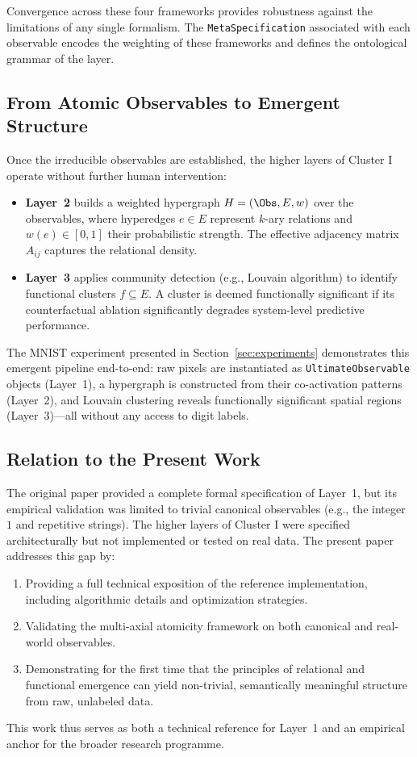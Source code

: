 Convergence across these four frameworks provides robustness against the limitations of any single formalism. The \texttt{MetaSpecification} associated with each observable encodes the weighting of these frameworks and defines the ontological grammar of the layer.

\subsection{From Atomic Observables to Emergent Structure}

Once the irreducible observables are established, the higher layers of Cluster I operate without further human intervention:

\begin{itemize}
    \item \textbf{Layer~2} builds a weighted hypergraph $H = (\Obs, E, w)$ over the observables, where hyperedges $e \in E$ represent $k$-ary relations and $w(e) \in [0,1]$ their probabilistic strength. The effective adjacency matrix $A_{ij}$ captures the relational density.
    \item \textbf{Layer~3} applies community detection (e.g., Louvain algorithm) to identify functional clusters $f \subseteq E$. A cluster is deemed functionally significant if its counterfactual ablation significantly degrades system-level predictive performance.
\end{itemize}

The MNIST experiment presented in Section~\ref{sec:experiments} demonstrates this emergent pipeline end-to-end: raw pixels are instantiated as \texttt{UltimateObservable} objects (Layer~1), a hypergraph is constructed from their co-activation patterns (Layer~2), and Louvain clustering reveals functionally significant spatial regions (Layer~3)---all without any access to digit labels.

\subsection{Relation to the Present Work}

The original \Apeiron{} paper \cite{beniers2026apeiron} provided a complete formal specification of Layer~1, but its empirical validation was limited to trivial canonical observables (e.g., the integer $1$ and repetitive strings). The higher layers of Cluster I were specified architecturally but not implemented or tested on real data. The present paper addresses this gap by:

\begin{enumerate}
    \item Providing a full technical exposition of the reference implementation, including algorithmic details and optimization strategies.
    \item Validating the multi-axial atomicity framework on both canonical and real-world observables.
    \item Demonstrating for the first time that the principles of relational and functional emergence can yield non-trivial, semantically meaningful structure from raw, unlabeled data.
\end{enumerate}

This work thus serves as both a technical reference for Layer~1 and an empirical anchor for the broader \Apeiron{} research programme.